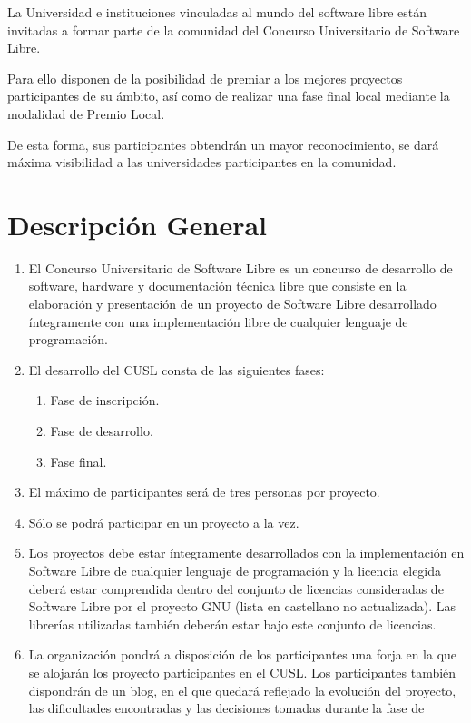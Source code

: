 La Universidad e instituciones vinculadas al mundo del software libre están
invitadas a formar parte de la comunidad del Concurso Universitario de Software
Libre.

Para ello disponen de la posibilidad de premiar a los mejores proyectos
participantes de su ámbito, así como de realizar una fase final local mediante
la modalidad de Premio Local.

De esta forma, sus participantes obtendrán un mayor reconocimiento, se dará
máxima visibilidad a las universidades participantes en la comunidad.

\section{Descripción General}

\begin{enumerate}
\item El Concurso Universitario de Software Libre es un concurso de desarrollo
de software, hardware y documentación técnica libre que consiste en la
elaboración y presentación de un proyecto de Software Libre desarrollado
íntegramente con una implementación libre de cualquier lenguaje de programación.
\item El desarrollo del CUSL consta de las siguientes fases:
    \begin{enumerate}
    \item Fase de inscripción.
    \item Fase de desarrollo.
    \item Fase final.
    \end{enumerate}
\item El máximo de participantes será de tres personas por proyecto.
\item Sólo se podrá participar en un proyecto a la vez.
\item Los proyectos debe estar íntegramente desarrollados con la implementación
en Software Libre de cualquier lenguaje de programación y la licencia elegida
deberá estar comprendida dentro del conjunto de licencias consideradas de
Software Libre por el proyecto GNU (lista en castellano no actualizada). Las
librerías utilizadas también deberán estar bajo este conjunto de licencias.
\item La organización pondrá a disposición de los participantes una forja en la
que se alojarán los proyecto participantes en el CUSL. Los participantes también
dispondrán de un blog, en el que quedará reflejado la evolución del proyecto,
las dificultades encontradas y las decisiones tomadas durante la fase de

\end{enumerate}
